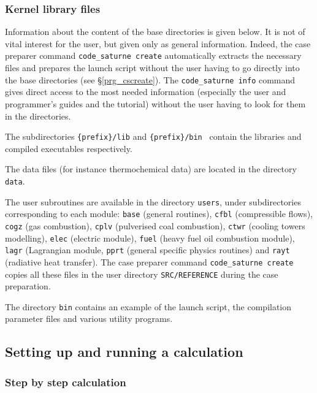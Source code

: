 {{{%
\subsubsection{\CS Kernel library files}
\label{prg_library}%
Information about the content of the \CS base directories is given below. It
is not of vital interest for the user, but given only as general
information. Indeed, the case preparer command \texttt{code\_saturne~create}
automatically extracts the necessary files and prepares the launch script
without the user having to go directly into the \CS base directories
(see \S\ref{prg_cscreate}).
The \texttt{code\_saturne~info} command gives direct
access to the most needed information (especially the user and programmer's
guides and the tutorial) without the user having to look for them in the \CS
directories.

The subdirectories \texttt{\{prefix\}/lib} and \texttt{\{prefix\}/bin }
contain the libraries and compiled executables respectively.

The data files (for instance thermochemical data) are located in the
directory \texttt{data}.

The user subroutines are available in the directory \texttt{users},
under subdirectories corresponding to each module:
\texttt{base} (general routines),
\texttt{cfbl} (compressible flows),
\texttt{cogz} (gas combustion),
\texttt{cplv} (pulverised coal combustion),
\texttt{ctwr} (cooling towers modelling),
\texttt{elec} (electric module),
\texttt{fuel} (heavy fuel oil combustion module),
\texttt{lagr} (Lagrangian module,
\texttt{pprt} (general specific physics routines) and
\texttt{rayt} (radiative heat transfer).
The case preparer command \texttt{code\_saturne~create} copies all these files
in the user directory \texttt{SRC/REFERENCE} during the case preparation.

The directory \texttt{bin} contains an example of the launch script, the
compilation parameter files and various utility programs.

\subsection{Setting up and running a calculation}

\subsubsection{Step by step calculation}

}}}
